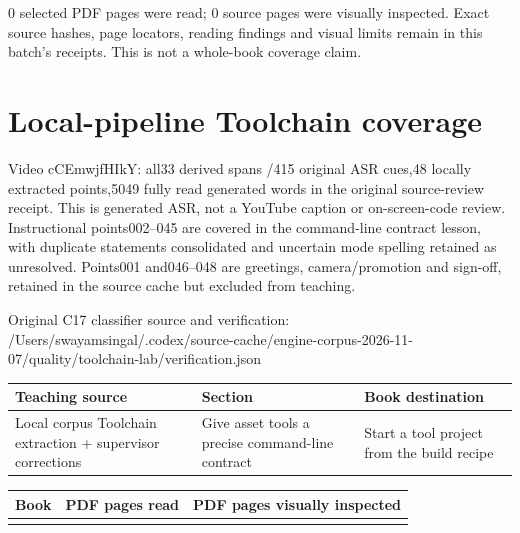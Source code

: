0 selected PDF pages were read; 0 source pages were visually inspected. Exact source hashes, page locators, reading findings and visual limits remain in this batch's receipts. This is not a whole-book coverage claim.

\section{Local-pipeline Toolchain coverage}\label{appendix-877738f6f4d2-local-pipeline-toolchain-coverage}

Video cCEmwjfHIkY: all33 derived spans /415 original ASR cues,48 locally extracted points,5049 fully read generated words in the original source-review receipt. This is generated ASR, not a YouTube caption or on-screen-code review. Instructional points002--045 are covered in the command-line contract lesson, with duplicate statements consolidated and uncertain mode spelling retained as unresolved. Points001 and046--048 are greetings, camera/promotion and sign-off, retained in the source cache but excluded from teaching.

Original C17 classifier source and verification: /Users/swayamsingal/.codex/source-cache/engine-corpus-2026-11-07/quality/toolchain-lab/verification.json

{\def\LTcaptype{none} %
\begin{longtable}[]{@{}
  >{\raggedright\arraybackslash}p{}
  >{\raggedright\arraybackslash}p{}
  >{\raggedright\arraybackslash}p{}@{}}
\toprule\noalign{}
\begin{minipage}[b]{\linewidth}\raggedright
Teaching source
\end{minipage} & \begin{minipage}[b]{\linewidth}\raggedright
Section
\end{minipage} & \begin{minipage}[b]{\linewidth}\raggedright
Book destination
\end{minipage} \\
\midrule\noalign{}
\endhead
\bottomrule\noalign{}
\endlastfoot
Local corpus Toolchain extraction + supervisor corrections & Give asset tools a precise command-line contract & Start a tool project from the build recipe \\
\end{longtable}
}

{\def\LTcaptype{none} %
\begin{longtable}[]{@{}lll@{}}
\toprule\noalign{}
Book & PDF pages read & PDF pages visually inspected \\
\midrule\noalign{}
\endhead
\bottomrule\noalign{}
\endlastfoot
\end{longtable}
}

